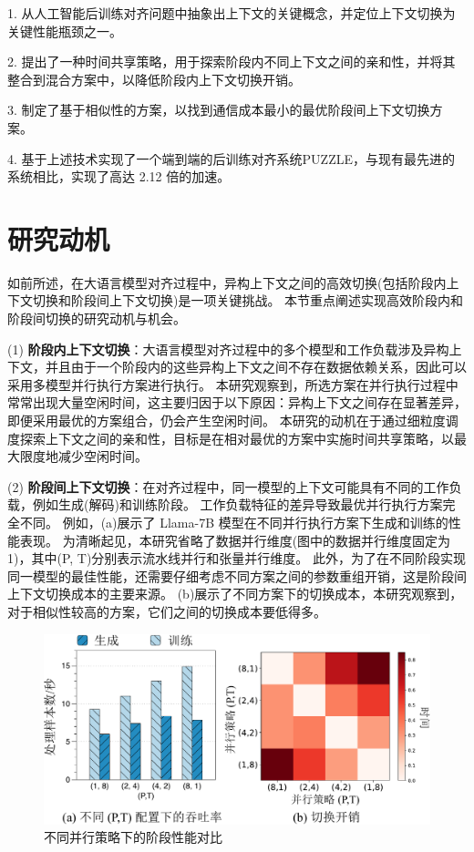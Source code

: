 1. 从人工智能后训练对齐问题中抽象出上下文的关键概念，并定位上下文切换为关键性能瓶颈之一。 

2. 提出了一种时间共享策略，用于探索阶段内不同上下文之间的亲和性，并将其整合到混合方案中，以降低阶段内上下文切换开销。 

3. 制定了基于相似性的方案，以找到通信成本最小的最优阶段间上下文切换方案。 

4. 基于上述技术实现了一个端到端的后训练对齐系统PUZZLE，与现有最先进的系统相比，实现了高达 2.12 倍的加速。 


\section{研究动机}
如前所述，在大语言模型对齐过程中，异构上下文之间的高效切换(包括阶段内上下文切换和阶段间上下文切换)是一项关键挑战。
本节重点阐述实现高效阶段内和阶段间切换的研究动机与机会。

(1) \textbf{阶段内上下文切换}：大语言模型对齐过程中的多个模型和工作负载涉及异构上下文，并且由于一个阶段内的这些异构上下文之间不存在数据依赖关系，因此可以采用多模型并行执行方案进行执行。
本研究观察到，所选方案在并行执行过程中常常出现大量空闲时间，这主要归因于以下原因：异构上下文之间存在显著差异，即便采用最优的方案组合，仍会产生空闲时间。
本研究的动机在于通过细粒度调度探索上下文之间的亲和性，目标是在相对最优的方案中实施时间共享策略，以最大限度地减少空闲时间。 

(2)	\textbf{阶段间上下文切换}：在对齐过程中，同一模型的上下文可能具有不同的工作负载，例如生成(解码)和训练阶段。
工作负载特征的差异导致最优并行执行方案完全不同。
例如，(a)展示了 Llama-7B 模型在不同并行执行方案下生成和训练的性能表现。
为清晰起见，本研究省略了数据并行维度(图中的数据并行维度固定为 1)，其中(P, T)分别表示流水线并行和张量并行维度。
此外，为了在不同阶段实现同一模型的最佳性能，还需要仔细考虑不同方案之间的参数重组开销，这是阶段间上下文切换成本的主要来源。
(b)展示了不同方案下的切换成本，本研究观察到，对于相似性较高的方案，它们之间的切换成本要低得多。 

\begin{figure}[ht]
    \centering
    \includegraphics[width=0.7\linewidth, keepaspectratio]{figures/puzzle/2-bg-pic2-crop.pdf}
    \setlength{\belowdisplayskip}{4pt}
    \caption{不同并行策略下的阶段性能对比}
    \label{fig:motiv2}
\end{figure}

